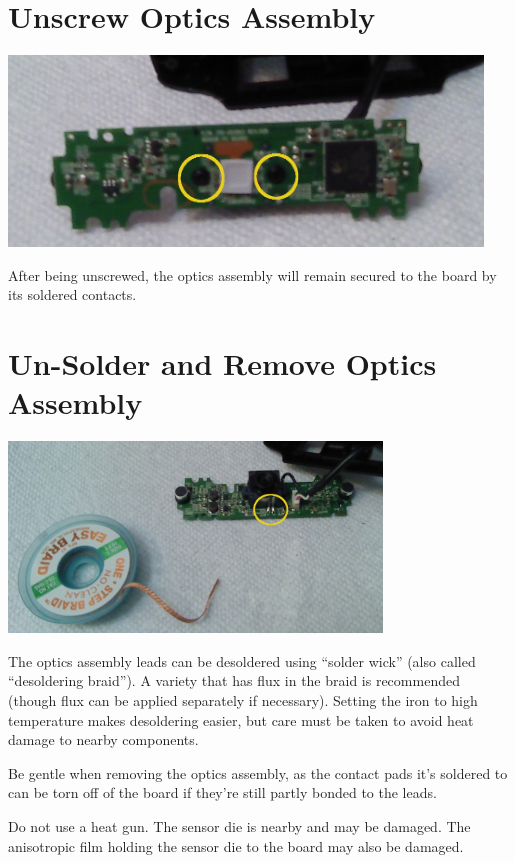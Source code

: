 \section{Unscrew Optics Assembly}

\includegraphics[height=2in]{pics-c920/07-opticsscrews.jpg}

After being unscrewed, the optics assembly will remain secured to the board
by its soldered contacts.

\section{Un-Solder and Remove Optics Assembly}
\label{sect-920-desolder}

\includegraphics[height=2in]{pics-c920/08-opticsleads.jpg}

The optics assembly leads can be desoldered using ``solder wick'' (also
called ``desoldering braid''). A variety that has flux in the braid is
recommended (though flux can be applied separately if necessary). Setting
the iron to high temperature makes desoldering easier, but care must be
taken to avoid heat damage to nearby components.

Be gentle when removing the optics assembly, as the contact pads it's
soldered to can be torn off of the board if they're still partly bonded to
the leads.

Do not use a heat gun. The sensor die is nearby and may be damaged. The
anisotropic film holding the sensor die to the board may also be damaged.

